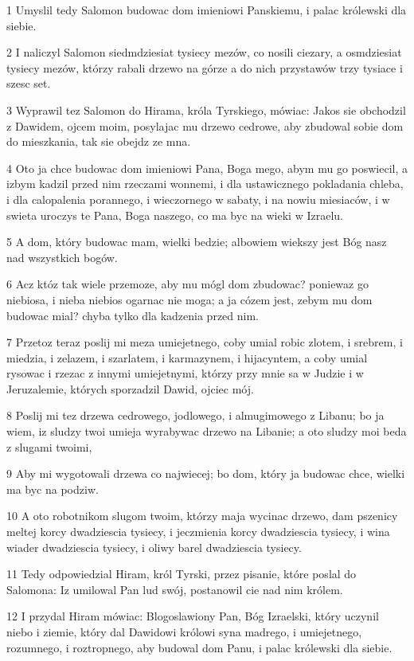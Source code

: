 \par 1 Umyslil tedy Salomon budowac dom imieniowi Panskiemu, i palac królewski dla siebie.
\par 2 I naliczyl Salomon siedmdziesiat tysiecy mezów, co nosili ciezary, a osmdziesiat tysiecy mezów, którzy rabali drzewo na górze a do nich przystawów trzy tysiace i szesc set.
\par 3 Wyprawil tez Salomon do Hirama, króla Tyrskiego, mówiac: Jakos sie obchodzil z Dawidem, ojcem moim, posylajac mu drzewo cedrowe, aby zbudowal sobie dom do mieszkania, tak sie obejdz ze mna.
\par 4 Oto ja chce budowac dom imieniowi Pana, Boga mego, abym mu go poswiecil, a izbym kadzil przed nim rzeczami wonnemi, i dla ustawicznego pokladania chleba, i dla calopalenia porannego, i wieczornego w sabaty, i na nowiu miesiaców, i w swieta uroczys te Pana, Boga naszego, co ma byc na wieki w Izraelu.
\par 5 A dom, który budowac mam, wielki bedzie; albowiem wiekszy jest Bóg nasz nad wszystkich bogów.
\par 6 Acz któz tak wiele przemoze, aby mu mógl dom zbudowac? poniewaz go niebiosa, i nieba niebios ogarnac nie moga; a ja cózem jest, zebym mu dom budowac mial? chyba tylko dla kadzenia przed nim.
\par 7 Przetoz teraz poslij mi meza umiejetnego, coby umial robic zlotem, i srebrem, i miedzia, i zelazem, i szarlatem, i karmazynem, i hijacyntem, a coby umial rysowac i rzezac z innymi umiejetnymi, którzy przy mnie sa w Judzie i w Jeruzalemie, których sporzadzil Dawid, ojciec mój.
\par 8 Poslij mi tez drzewa cedrowego, jodlowego, i almugimowego z Libanu; bo ja wiem, iz sludzy twoi umieja wyrabywac drzewo na Libanie; a oto sludzy moi beda z slugami twoimi,
\par 9 Aby mi wygotowali drzewa co najwiecej; bo dom, który ja budowac chce, wielki ma byc na podziw.
\par 10 A oto robotnikom slugom twoim, którzy maja wycinac drzewo, dam pszenicy meltej korcy dwadziescia tysiecy, i jeczmienia korcy dwadziescia tysiecy, i wina wiader dwadziescia tysiecy, i oliwy barel dwadziescia tysiecy.
\par 11 Tedy odpowiedzial Hiram, król Tyrski, przez pisanie, które poslal do Salomona: Iz umilowal Pan lud swój, postanowil cie nad nim królem.
\par 12 I przydal Hiram mówiac: Blogoslawiony Pan, Bóg Izraelski, który uczynil niebo i ziemie, który dal Dawidowi królowi syna madrego, i umiejetnego, rozumnego, i roztropnego, aby budowal dom Panu, i palac królewski dla siebie.
